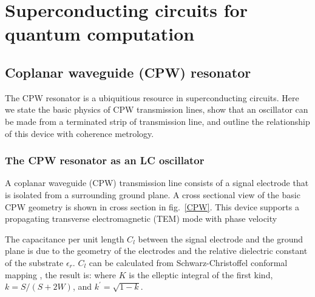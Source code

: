 \chapter{Superconducting circuits for quantum computation}
\label{ch:sc_circuits}

\section{Coplanar waveguide (CPW) resonator}
The CPW resonator is a ubiquitious resource in superconducting circuits.
Here we state the basic physics of CPW transmission lines, show that an oscillator can be made from a terminated strip of transmission line, and outline the relationship of this device with coherence metrology.
\subsection{The CPW resonator as an LC oscillator}
A coplanar waveguide (CPW) transmission line consists of a signal electrode that is isolated from a surrounding ground plane.
A cross sectional view of the basic CPW geometry is shown in cross section in fig.~\ref{CPW}.
This device supports a propagating transverse electromagnetic (TEM) mode  with phase velocity \cite{Pozar}

The capacitance per unit length $C_l$ between the signal electrode and the ground plane is due to the geometry of the electrodes and the relative dielectric constant of the substrate $\epsilon_r$.
$C_l$ can be calculated from Schwarz-Christoffel conformal mapping \cite{GaoThesis}, the result is:
where $K$ is the elleptic integral of the first kind, $k = S/ \left( S + 2W \right)$, and $k^\prime = \sqrt{1 - k}$.

